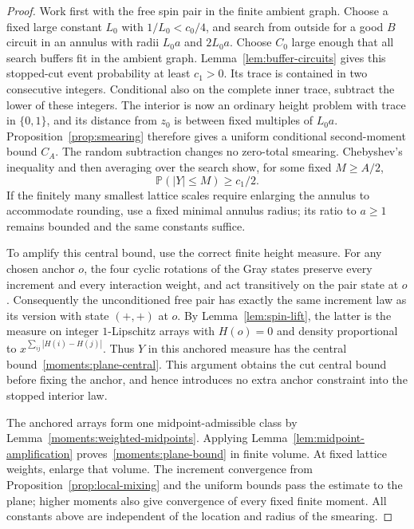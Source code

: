 \documentclass[11pt]{article}
\newcommand{\Prob}{\mathbb P}
\theoremstyle{definition}
\theoremstyle{remark}
\numberwithin{equation}{section}
\begin{document}
\begin{proof}
Work first with the free spin pair in the finite ambient graph.
Choose a fixed large constant $L_0$ with $1/L_0<c_0/4$, and search
from outside for a good $B$ circuit in an annulus with radii
$L_0a$ and $2L_0a$.  Choose $C_0$ large enough that all search buffers
fit in the ambient graph.  Lemma~\ref{lem:buffer-circuits} gives this
stopped-cut event probability at least $c_1>0$.  Its trace is contained
in two consecutive integers.  Conditional also on the complete inner
trace, subtract the lower of these integers.  The interior is now an
ordinary height problem with trace in $\{0,1\}$, and its distance from
$z_0$ is between fixed multiples of $L_0a$.  Proposition~\ref{prop:smearing}
therefore gives a uniform conditional second-moment bound $C_A$.
The random subtraction changes no zero-total smearing.  Chebyshev's
inequality and then averaging over the search show, for some fixed
$M\geq A/2$,
\begin{equation}\label{moments:plane-central}
 \Prob(|Y|\leq M)\geq c_1/2.
\end{equation}
If the finitely many smallest lattice scales require enlarging the
annulus to accommodate rounding, use a fixed minimal annulus radius;
its ratio to $a\geq1$ remains bounded and the same constants suffice.

To amplify this central bound, use the correct finite height measure.
For any chosen anchor $o$, the four cyclic rotations of the Gray states
preserve every increment and every interaction weight, and act
transitively on the pair state at $o$.  Consequently the unconditioned
free pair has exactly the same increment law as its version with state
$(+,+)$ at $o$.  By Lemma~\ref{lem:spin-lift}, the latter is the measure
on integer $1$-Lipschitz arrays with $H(o)=0$ and density proportional
to $x^{\sum_{ij}|H(i)-H(j)|}$.  Thus $Y$ in this anchored measure has
the central bound~\eqref{moments:plane-central}.  This argument obtains
the cut central bound before fixing the anchor, and hence introduces
no extra anchor constraint into the stopped interior law.

The anchored arrays form one midpoint-admissible class by
Lemma~\ref{moments:weighted-midpoints}.  Applying
Lemma~\ref{lem:midpoint-amplification} proves~\eqref{moments:plane-bound}
in finite volume.  At fixed lattice weights, enlarge that volume.
The increment convergence from Proposition~\ref{prop:local-mixing}
and the uniform bounds pass the estimate to the plane; higher moments
also give convergence of every fixed finite moment.  All constants
above are independent of the location and radius of the smearing.
\end{proof}
\end{document}
